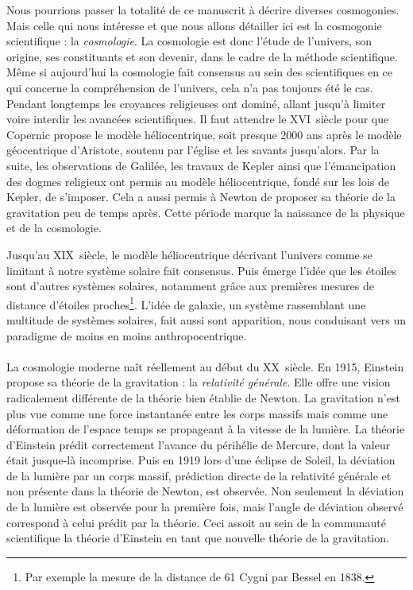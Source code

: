 Nous pourrions passer la totalité de ce manuscrit à décrire diverses cosmogonies. Mais celle qui nous intéresse et que nous allons détailler ici est la cosmogonie scientifique : la \emph{cosmologie}. La cosmologie est donc l'étude de l'univers, son origine, ses constituants et son devenir, dans le cadre de la méthode scientifique. Même si aujourd'hui la cosmologie fait consensus au sein des scientifiques en ce qui concerne la compréhension de l'univers, cela n'a pas toujours été le cas. Pendant longtemps les croyances religieuses ont dominé, allant jusqu'à limiter voire interdir les avancées scientifiques.
Il faut attendre le \textsc{XVI}\ieme~siècle pour que Copernic propose le modèle héliocentrique, soit presque \num{2000} ans après le modèle géocentrique d'Aristote, soutenu par l'église et les savants jusqu'alors.
Par la suite, les observations de Galilée, les travaux de Kepler ainsi que l'émancipation des dogmes religieux ont permis au modèle héliocentrique, fondé sur les lois de Kepler, de s'imposer. Cela a aussi permis à Newton de proposer sa théorie de la gravitation peu de temps après. Cette période marque la naissance de la physique et de la cosmologie.

Jusqu'au \textsc{XIX}\ieme~siècle, le modèle héliocentrique décrivant l'univers comme se limitant à notre système solaire fait consensus. Puis émerge l'idée que les étoiles sont d'autres systèmes solaires, notamment grâce aux premières mesures de distance d'étoiles proches\footnote{Par exemple la mesure de la distance de 61 Cygni par Bessel en 1838.}. L'idée de galaxie, un système rassemblant une multitude de systèmes solaires, fait aussi sont apparition, nous conduisant vers un paradigme de moins en moins anthropocentrique.

\paragraph{}
La cosmologie moderne naît réellement au début du \textsc{XX}\ieme~siècle. En 1915, Einstein propose sa théorie de la gravitation : la \emph{relativité générale}. Elle offre une vision radicalement différente de la théorie bien établie de Newton. La gravitation n'est plus vue comme une force instantanée entre les corps massifs mais comme une déformation de l'espace temps se propageant à la vitesse de la lumière. La théorie d'Einstein prédit correctement l'avance du périhélie de Mercure, dont la valeur était jusque-là incomprise. Puis en 1919 lors d'une éclipse de Soleil, la déviation de la lumière par un corps massif, prédiction directe de la relativité générale et non présente dans la théorie de Newton, est observée. Non seulement la déviation de la lumière est observée pour la première fois, mais l'angle de déviation observé correspond à celui prédit par la théorie. Ceci assoit au sein de la communauté scientifique la théorie d'Einstein en tant que nouvelle théorie de la gravitation.

